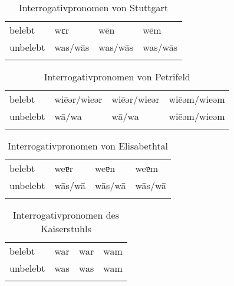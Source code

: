 
\begin{table}[H]
	\caption{Interrogativpronomen von Stuttgart \citep[162]{Frey1975}}\label{table74}
	\begin{tabular}{llll}
		\lsptoprule
		& \NOM & \AKK & \DAT\\\midrule
 belebt & wɛr & w\=en & w\=em\\
		unbelebt & was/w\=as & was/w\=as & was/w\=as\\
		\lspbottomrule
	\end{tabular}
\end{table}


\begin{table}[H]
	\caption{Interrogativpronomen von Petrifeld \citep[66-67]{Moser1937}}\label{table75}
	\begin{tabular}{llll}
		\lsptoprule
		& \NOM & \AKK & \DAT\\\midrule
 belebt & wi\=eǝr/wieǝr & wi\=eǝr/wieǝr & wi\=eǝm/wieǝm\\
		unbelebt & w\=a/wa & w\=a/wa & wi\=eǝm/wieǝm\\
		\lspbottomrule
	\end{tabular}
\end{table}


\begin{table}[H]
	\caption{Interrogativpronomen von Elisabethtal \citep[53]{Žirmunskij1928/29}}\label{table76}
	\begin{tabular}{llll}
		\lsptoprule
		& \NOM & \AKK & \DAT\\\midrule
 belebt & weɐr & weɐn & weɐm\\
		unbelebt & w\=as/w\=a & w\=as/w\=a & w\=as/w\=a\\
		\lspbottomrule
	\end{tabular}
\end{table}


\begin{table}[H]
	\caption{Interrogativpronomen des Kaiserstuhls \citep[385]{Noth1993}}\label{table77}
	\begin{tabular}{llll}
		\lsptoprule
		& \NOM & \AKK & \DAT\\\midrule
 belebt & war & war & wam\\
		unbelebt & was & was & wam\\
		\lspbottomrule
	\end{tabular}
\end{table}

